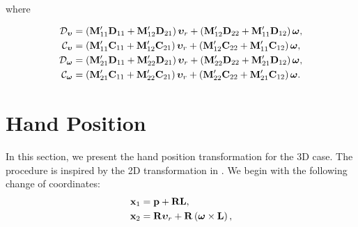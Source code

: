 \vspace*{-1.6em}

\noindent where

\vspace*{-1.7em}

\begin{subequations}
    \begin{align}
        \mathcal{D}_{\bm{\upsilon}} &= \left(\mathbf{M}_{11}^{\prime}\mathbf{D}_{11} + \mathbf{M}_{12}^{\prime}\mathbf{D}_{21}\right)\bm{\upsilon}_r + \left(\mathbf{M}_{12}^{\prime}\mathbf{D}_{22} + \mathbf{M}_{11}^{\prime}\mathbf{D}_{12}\right)\bm{\omega}, \\
        \mathcal{C}_{\bm{\upsilon}} &= \left(\mathbf{M}_{11}^{\prime}\mathbf{C}_{11} + \mathbf{M}_{12}^{\prime}\mathbf{C}_{21}\right)\bm{\upsilon}_r + \left(\mathbf{M}_{12}^{\prime}\mathbf{C}_{22} + \mathbf{M}_{11}^{\prime}\mathbf{C}_{12}\right)\bm{\omega}, \\
        \mathcal{D}_{\bm{\omega}} &= \left(\mathbf{M}_{21}^{\prime}\mathbf{D}_{11} + \mathbf{M}_{22}^{\prime}\mathbf{D}_{21}\right)\bm{\upsilon}_r + \left(\mathbf{M}_{22}^{\prime}\mathbf{D}_{22} + \mathbf{M}_{21}^{\prime}\mathbf{D}_{12}\right)\bm{\omega}, \\
        \mathcal{C}_{\bm{\omega}} &= \left(\mathbf{M}_{21}^{\prime}\mathbf{C}_{11} + \mathbf{M}_{22}^{\prime}\mathbf{C}_{21}\right)\bm{\upsilon}_r + \left(\mathbf{M}_{22}^{\prime}\mathbf{C}_{22} + \mathbf{M}_{21}^{\prime}\mathbf{C}_{12}\right)\bm{\omega}.
    \end{align} \label{eq:handpos_def_ode_components}
\end{subequations}

\vspace*{-1.7em}

\section{Hand Position}
\label{sec:handpos_def_hand_position}
\vspace*{-0.3em}

In this section, we present the hand position transformation for the 3D case.
The procedure is inspired by the 2D transformation in \cite{paliotta_trajectory_2019}.
We begin with the following change of coordinates: \vspace*{-0.5em}
\begin{subequations}
    \begin{align}
        \mathbf{x}_1 &= \mathbf{p} + \mathbf{R}\mathbf{L}, \label{eq:handpos_def_hand_position} \\
        \mathbf{x}_2 &= \mathbf{R}\bm{\upsilon}_r + \mathbf{R}\left(\bm{\omega} \times \mathbf{L}\right),
    \end{align} \label{eq:handpos_def_hand_transform_initial}
\end{subequations}


